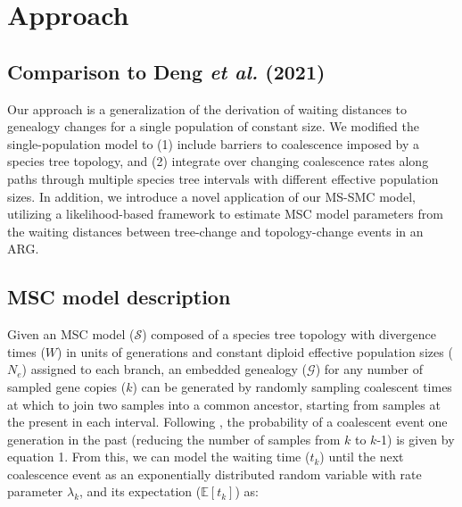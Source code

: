 \documentclass[11pt]{article}
\begin{document}


\section{Approach}
\subsection{Comparison to Deng \emph{et al.} (2021)} 

Our approach is a generalization of the \citet{deng_distribution_2021} derivation 
of waiting distances to genealogy changes for a single population of constant size. 
We modified the single-population model to (1) include barriers to coalescence imposed
by a species tree topology, and (2) integrate over changing coalescence rates along
paths through multiple species tree intervals with different effective population 
sizes. 
In addition, we introduce a novel application of our MS-SMC model, utilizing
a likelihood-based framework to estimate MSC model parameters from the waiting
distances between tree-change and topology-change events in an ARG.


\subsection{MSC model description}
Given an MSC model ($\mathcal{S}$) composed of a species tree topology with divergence
times ($W$) in units of generations and constant diploid effective population 
sizes ($N_e$) assigned to each branch, an embedded genealogy ($\mathcal{G}$) for 
any number of sampled gene copies ($k$) can be generated
by randomly sampling coalescent times at which to join two samples into a 
common ancestor, starting from samples at the present in each interval.
Following \citet{kingman1982coalescent}, the probability of a 
coalescent event one generation in the past (reducing the 
number of samples from $k$ to $k$-1) 
is given by equation 1. 
From this, we can model the waiting time ($t_k$) until the next coalescence 
event as an exponentially distributed random variable with rate parameter 
$\lambda_k$, and its expectation ($\mathbb{E}[t_k]$) as:
% 
\end{document}
